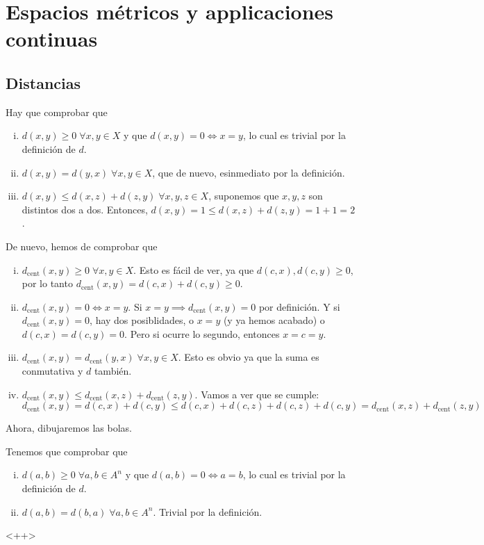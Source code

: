 \chapter{Espacios m\'etricos y applicaciones continuas}
\section{Distancias}

\begin{ej}
	Hay que comprobar que
	\begin{enumerate}[i)]
		\item $ d(x,y) \geq 0 \; \forall x,y \in X $ y que $ d(x,y) = 0 \iff x = y $, lo cual es trivial por la definición de $ d $.
		\item $ d(x,y) = d(y,x) \; \forall x, y \in X $, que de nuevo, esinmediato por la definición.
		\item $ d(x,y) \leq d(x,z) + d(z,y) \; \forall x, y, z \in X $, suponemos que $ x, y, z $ son distintos dos a dos. Entonces,
			$ d(x,y) = 1 \leq d(x, z) + d(z, y) = 1 + 1 = 2 $.
	\end{enumerate}
\end{ej}

\begin{ej}
	De nuevo, hemos de comprobar que
	\begin{enumerate}[i)]
		\item $d_{\text{cent}}(x, y) \geq 0 \; \forall x, y \in X$. Esto es fácil de ver, ya que $d(c, x), d(c,y) \geq 0$, por lo tanto
			$d_{\text{cent}}(x,y) = d(c,x) + d(c,y) \geq 0$.
		\item $d_{\text{cent}}(x, y) = 0 \iff x = y$. Si $x = y \implies d_{\text{cent}}(x,y) = 0$ por definición. Y si $d_{\text{cent}}(x,y) = 0$,
			hay dos posiblidades, o $x = y$ (y ya hemos acabado) o $d(c, x) = d(c,y) = 0$. Pero si ocurre lo segundo, entonces $x = c = y$.
		\item $d_{\text{cent}}(x, y) = d_{\text{cent}}(y, x) \; \forall x, y \in X$. Esto es obvio ya que la suma es conmutativa y $d$ tambi\'en.
		\item $d_{\text{cent}}(x,y) \leq d_{\text{cent}}(x, z) + d_{\text{cent}}(z, y)$. Vamos a ver que se cumple:
			\[
				d_{\text{cent}}(x, y) = d(c,x) + d(c,y) \leq d(c,x) + d(c,z) + d(c,z) + d(c,y) =
				d_{\text{cent}}(x, z) + d_{\text{cent}}(z,y)
			\]
	\end{enumerate}
	Ahora, dibujaremos las bolas.
	\begin{center}
		
	\end{center}
\end{ej}

\begin{ej}
	Tenemos que comprobar que
	\begin{enumerate}[i)]
		\item $d(a,b) \geq 0 \; \forall a,b \in A^n$ y que $d(a,b) = 0 \iff a = b$, lo cual es trivial por la definición de $d$.
		\item $d(a,b) = d(b,a) \; \forall a,b \in A^n$. Trivial por la definición.
	\end{enumerate}<++>
\end{ej}
